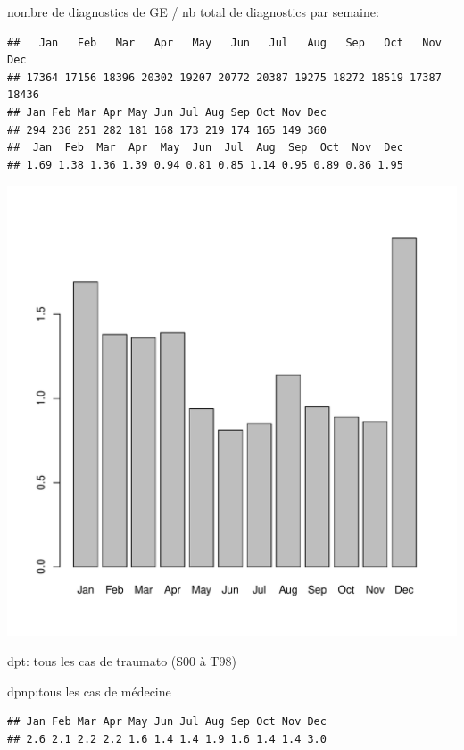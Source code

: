 \documentclass[12pt,english,french,twoside]{book}\usepackage[]{graphicx}\usepackage[]{color}
\makeatletter
\def\maxwidth{ %
  \ifdim\Gin@nat@width>\linewidth
    \linewidth
  \else
    \Gin@nat@width
  \fi
}
\newenvironment{kframe}{%
 \def\at@end@of@kframe{}%
 \ifinner\ifhmode%
  \def\at@end@of@kframe{\end{minipage}}%
  \begin{minipage}{\columnwidth}%
 \fi\fi%
 \def\FrameCommand##1{\hskip\@totalleftmargin \hskip-\fboxsep
 \colorbox{shadecolor}{##1}\hskip-\fboxsep
     \hskip-\linewidth \hskip-\@totalleftmargin \hskip\columnwidth}%
 \MakeFramed {\advance\hsize-\width
   \@totalleftmargin\z@ \linewidth\hsize
   \@setminipage}}%
 {\par\unskip\endMakeFramed%
 \at@end@of@kframe}
\newenvironment{knitrout}{}{} %
\makeatother
\begin{document}
nombre de diagnostics de GE / nb total de diagnostics par semaine:
\begin{knitrout}
\color{fgcolor}\begin{kframe}
\begin{verbatim}
##   Jan   Feb   Mar   Apr   May   Jun   Jul   Aug   Sep   Oct   Nov   Dec 
## 17364 17156 18396 20302 19207 20772 20387 19275 18272 18519 17387 18436
## Jan Feb Mar Apr May Jun Jul Aug Sep Oct Nov Dec 
## 294 236 251 282 181 168 173 219 174 165 149 360
##  Jan  Feb  Mar  Apr  May  Jun  Jul  Aug  Sep  Oct  Nov  Dec 
## 1.69 1.38 1.36 1.39 0.94 0.81 0.85 1.14 0.95 0.89 0.86 1.95
\end{verbatim}
\end{kframe}
\includegraphics[width=\maxwidth]{figure/invs} 

\end{knitrout}



dpt: tous les cas de traumato (S00 à T98)

dpnp:tous les cas de médecine  

\begin{knitrout}
\color{fgcolor}\begin{kframe}
\begin{verbatim}
## Jan Feb Mar Apr May Jun Jul Aug Sep Oct Nov Dec 
## 2.6 2.1 2.2 2.2 1.6 1.4 1.4 1.9 1.6 1.4 1.4 3.0
\end{verbatim}
\end{kframe}
\end{knitrout}
\end{document}

